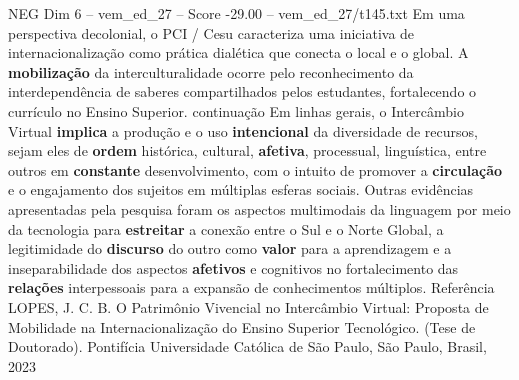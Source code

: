 \begin{textsample}{NEG Dim 6 – vem\_ed\_27 – Score -29.00 – vem\_ed\_27/t145.txt}
Em uma perspectiva decolonial, o PCI / Cesu caracteriza uma iniciativa de internacionalização como prática dialética que conecta o local e o global.
A \textbf{mobilização} da interculturalidade ocorre pelo reconhecimento da interdependência de saberes compartilhados pelos estudantes, fortalecendo o currículo no Ensino Superior. continuação Em linhas gerais, o Intercâmbio Virtual \textbf{implica} a produção e o uso \textbf{intencional} da diversidade de recursos, sejam eles de \textbf{ordem} histórica, cultural, \textbf{afetiva}, processual, linguística, entre outros em \textbf{constante} desenvolvimento, com o intuito de promover a \textbf{circulação} e o engajamento dos sujeitos em múltiplas esferas sociais.
Outras evidências apresentadas pela pesquisa foram os aspectos multimodais da linguagem por meio da tecnologia para \textbf{estreitar} a conexão entre o Sul e o Norte Global, a legitimidade do \textbf{discurso} do outro como \textbf{valor} para a aprendizagem e a inseparabilidade dos aspectos \textbf{afetivos} e cognitivos no fortalecimento das \textbf{relações} interpessoais para a expansão de conhecimentos múltiplos.
Referência LOPES, J.
C.
B.
O Patrimônio Vivencial no Intercâmbio Virtual: Proposta de Mobilidade na Internacionalização do Ensino Superior Tecnológico. (Tese de Doutorado).
Pontifícia Universidade Católica de São Paulo, São Paulo, Brasil, 2023

\end{textsample}
